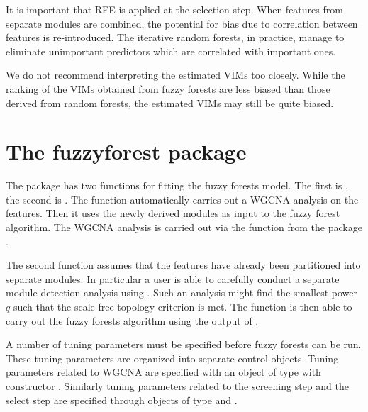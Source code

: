 \documentclass[article,shortnames]{jss}
\begin{document}
It is important that RFE is applied at the selection step.  When features from separate modules are combined,
the potential for bias due to correlation between features is re-introduced.  The iterative random forests, in practice, manage to
eliminate unimportant predictors which are correlated with important ones.  

We do not recommend interpreting the estimated VIMs too closely.  While the ranking of the VIMs obtained from
fuzzy forests are less biased than those derived from random forests, the estimated VIMs may still be quite biased.

\section{The fuzzyforest package}
The package   has two functions for fitting the fuzzy forests model.  The first is , the
second is .  The function  automatically carries out a WGCNA analysis on the features.
Then it uses the newly derived modules as input to the fuzzy forest algorithm.  The WGCNA analysis is carried out via the 
 function from the package .  

The second function  assumes that the features have already been partitioned into separate modules.
In particular a user is able to carefully conduct a separate module detection analysis using .  Such an 
analysis might find the smallest power $q$ such that the scale-free topology criterion is met.  The function 
is then able to carry out the fuzzy forests algorithm using the output of .

A number of tuning parameters must be specified before fuzzy forests can be run.   These tuning parameters are organized
into separate control objects.  Tuning parameters related to WGCNA are specified with an  object of type 
with constructor \newline {}.
Similarly tuning parameters related to the screening step and the select step are specified through objects of type 
 and .  
\end{document}
